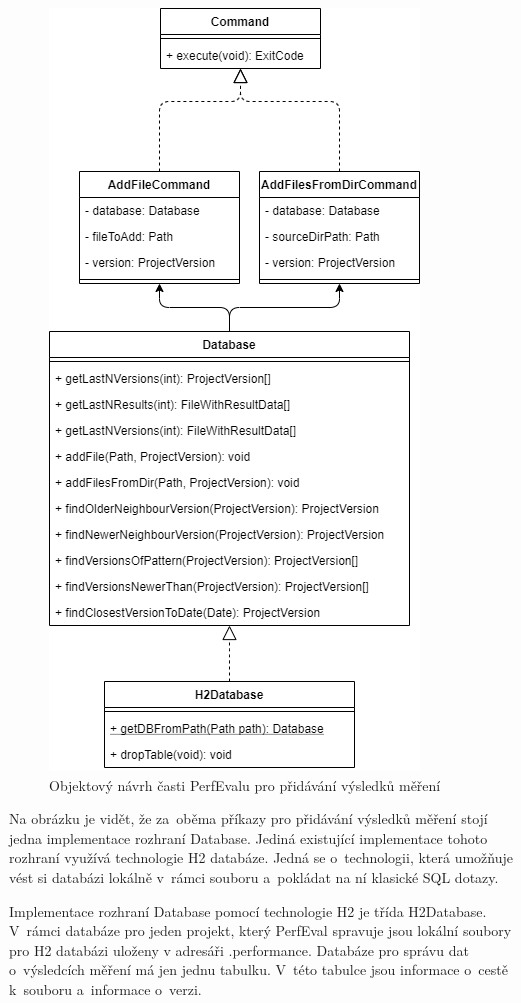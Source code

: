 \begin{figure}[h!]
    \centering
    \includegraphics[height=0.5\textheight]{../img/perfeval_h2db.png}
    \caption{Objektový návrh časti PerfEvalu pro přidávání výsledků měření}
\end{figure}

Na obrázku je vidět, že za~oběma příkazy pro přidávání výsledků měření stojí jedna implementace rozhraní Database.
Jediná existující implementace tohoto rozhraní využívá technologie H2 databáze. Jedná se o~technologii, která umožňuje
vést si databázi lokálně v~rámci souboru a~pokládat na ní klasické SQL dotazy.

Implementace rozhraní Database pomocí technologie H2 je třída H2Database. V~rámci databáze pro jeden projekt, který
PerfEval spravuje jsou lokální soubory pro H2 databázi uloženy v adresáři .performance. Databáze pro správu dat o~výsledcích
měření má jen jednu tabulku. V~této tabulce jsou informace o~cestě k~souboru a~informace o~verzi.

